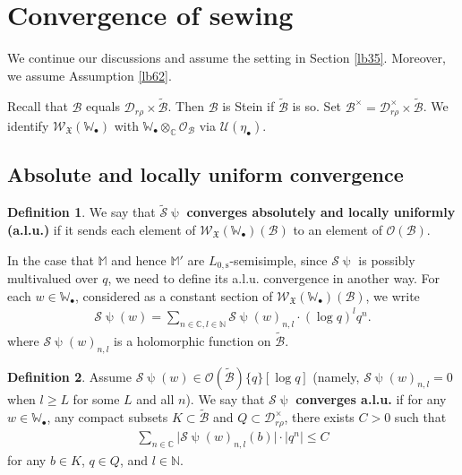 \documentclass[12pt,a4paper,notitlepage]{article}
\theoremstyle{definition}
\newtheorem{df}{Definition}[section]
\theoremstyle{plain}
\newcommand{\fk}{\mathfrak}
\newcommand{\mc}{\mathcal}
\newcommand{\wtd}{\widetilde}
\newcommand{\scr}{\mathscr}
\newcommand{\blt}{\bullet}
\newcommand{\Wbb}{\mathbb W}
\newcommand{\Mbb}{\mathbb M}
\newcommand{\Cbb}{\mathbb C}
\newcommand{\Nbb}{\mathbb N}
\newcommand{\Lss}{{L_{0,\mathrm{s}}}}
\numberwithin{equation}{section}
\begin{document}
\section{Convergence of sewing}\label{lb52}




We continue our discussions and assume the setting in Section \ref{lb35}. Moreover, we assume Assumption \ref{lb62}.

Recall that $\mc B$ equals $\mc D_{r\rho}\times\wtd{\mc B}$. Then $\mc B$ is Stein if  $\wtd{\mc B}$ is so. Set $\mc B^\times=\mc D_{r\rho}^\times\times\wtd{\mc B}$. \index{B@$\mc B^\times$} We identify $\scr W_{\fk X}(\Wbb_\blt)$ with $\Wbb_\blt\otimes_\Cbb\scr O_{\mc B}$ via $\mc U(\eta_\blt)$.



\subsection*{Absolute and locally uniform convergence}



\begin{df}
We say that $\wtd{\mc S}\uppsi$  \textbf{converges absolutely and locally uniformly (a.l.u.)} if it sends each element of $\scr W_{\fk X}(\Wbb_\blt)(\mc B)$ to an element of $\scr O(\mc B)$. 
\end{df}







In the case that $\Mbb$ and hence $\Mbb'$ are $\Lss$-semisimple, since $\mc S\uppsi$ is possibly multivalued over $q$, we need to define its a.l.u. convergence in another way. For each $w\in \Wbb_\blt$, considered as a constant section of $\scr W_{\fk X}(\Wbb_\blt)(\mc B)$, we write
\begin{align*}
\mc S\uppsi(w)=\sum_{n\in \Cbb,l\in\Nbb}\mc S\uppsi(w)_{n,l}\cdot (\log q)^lq^n.
\end{align*}
where  $\mc S\uppsi(w)_{n,l}$ is a holomorphic function on $\wtd{\mc B}$. 


\begin{df}\label{lb37}
Assume $\mc S\uppsi(w)\in\scr O(\wtd{\mc B})\{q\}[\log q]$ (namely, $\mc S\uppsi(w)_{n,l}=0$ when $l\geq L$ for some $L$ and all $n$). We say that $\mc S\uppsi$ \textbf{converges a.l.u.} if  for any $w\in\Wbb_\blt$, any compact subsets $K\subset\wtd{\mc B}$ and $Q\subset\mc D_{r\rho}^\times$,  there exists $C>0$ such that
\begin{align}
	\sum_{n\in\Cbb}\big|\mc S\uppsi(w)_{n,l}(b)\big|\cdot |q^{n}|\leq C
\end{align}
for any $b\in K$, $q\in Q$, and $l\in\Nbb$. 
\end{df} 
\end{document}
